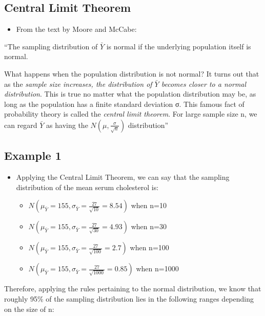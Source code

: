 \documentclass[
]{book}
\providecommand{\tightlist}{%
  \setlength{\itemsep}{0pt}\setlength{\parskip}{0pt}}
\begin{document}
\hypertarget{central-limit-theorem-1}{%
\subsection{Central Limit Theorem}\label{central-limit-theorem-1}}

\begin{itemize}
\tightlist
\item
  From the text by Moore and McCabe:
\end{itemize}

``The sampling distribution of \(\bar Y\) is normal if the underlying population itself is normal.

What happens when the population distribution is not normal? It turns out that as the \emph{sample size increases, the distribution of \(\bar Y\) becomes closer to a normal distribution}. This is true no matter what the population distribution may be, as long as the population has a finite standard deviation σ. This famous fact of probability theory is called the \emph{central limit theorem}. For large sample size n, we can regard \(\bar Y\) as having the \(N\left(\mu,\frac{\sigma}{\sqrt n}\right)\) distribution''

\hypertarget{example-1-1}{%
\subsection{Example 1}\label{example-1-1}}

\begin{itemize}
\tightlist
\item
  Applying the Central Limit Theorem, we can say that the sampling distribution of the mean serum cholesterol is:

  \begin{itemize}
  \tightlist
  \item
    \(N\left(\mu_{\bar Y}=155,\sigma_{\bar Y}=\frac{27}{\sqrt {10}}=8.54\right)\) when n=10
  \item
    \(N\left(\mu_{\bar Y}=155,\sigma_{\bar Y}=\frac{27}{\sqrt {30}}=4.93\right)\) when n=30
  \item
    \(N\left(\mu_{\bar Y}=155,\sigma_{\bar Y}=\frac{27}{\sqrt {100}}=2.7\right)\) when n=100
  \item
    \(N\left(\mu_{\bar Y}=155,\sigma_{\bar Y}=\frac{27}{\sqrt {1000}}=0.85\right)\) when n=1000
  \end{itemize}
\end{itemize}

Therefore, applying the rules pertaining to the normal distribution, we know that roughly 95\% of the sampling distribution lies in the following ranges depending on the size of n:
\end{document}
